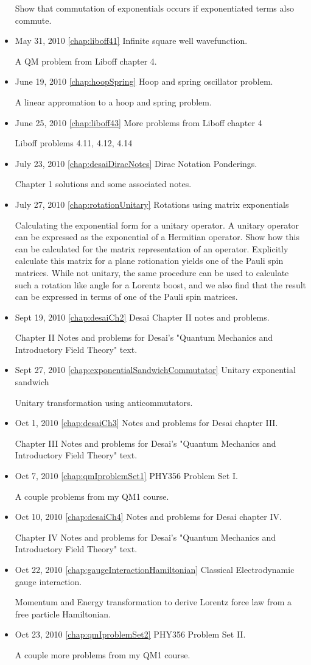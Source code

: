 \begin{itemize}
Show that commutation of exponentials occurs if exponentiated terms also commute.\item May 31, 2010 \ref{chap:liboff41} Infinite square well wavefunction.

A QM problem from Liboff chapter 4.\item June 19, 2010 \ref{chap:hoopSpring} Hoop and spring oscillator problem.

A linear appromation to a hoop and spring problem.\item June 25, 2010 \ref{chap:liboff43} More problems from Liboff chapter 4

Liboff problems 4.11, 4.12, 4.14\item July 23, 2010 \ref{chap:desaiDiracNotes} Dirac Notation Ponderings.

Chapter 1 solutions and some associated notes.\item July 27, 2010 \ref{chap:rotationUnitary} Rotations using matrix exponentials

Calculating the exponential form for a unitary operator.  A unitary operator can be expressed as the exponential of a Hermitian operator.  Show how this can be calculated for the matrix representation of an operator.  Explicitly calculate this matrix for a plane rotionation yields one of the Pauli spin matrices.  While not unitary, the same procedure can be used to calculate such a rotation like angle for a Lorentz boost, and we also find that the result can be expressed in terms of one of the Pauli spin matrices.\item Sept 19, 2010 \ref{chap:desaiCh2} Desai Chapter II notes and problems.

Chapter II Notes and problems for Desai's "Quantum Mechanics and Introductory Field Theory" text.\item Sept 27, 2010 \ref{chap:exponentialSandwichCommutator} Unitary exponential sandwich

Unitary transformation using anticommutators.\item Oct 1, 2010 \ref{chap:desaiCh3} Notes and problems for Desai chapter III.

Chapter III Notes and problems for Desai's "Quantum Mechanics and Introductory Field Theory" text.\item Oct 7, 2010 \ref{chap:qmIproblemSet1} PHY356 Problem Set I.

A couple problems from my QM1 course.\item Oct 10, 2010 \ref{chap:desaiCh4} Notes and problems for Desai chapter IV.

Chapter IV Notes and problems for Desai's "Quantum Mechanics and Introductory Field Theory" text.\item Oct 22, 2010 \ref{chap:gaugeInteractionHamiltonian} Classical Electrodynamic gauge interaction.

Momentum and Energy transformation to derive Lorentz force law from a free particle Hamiltonian.\item Oct 23, 2010 \ref{chap:qmIproblemSet2} PHY356 Problem Set II.

A couple more problems from my QM1 course.\end{itemize}
